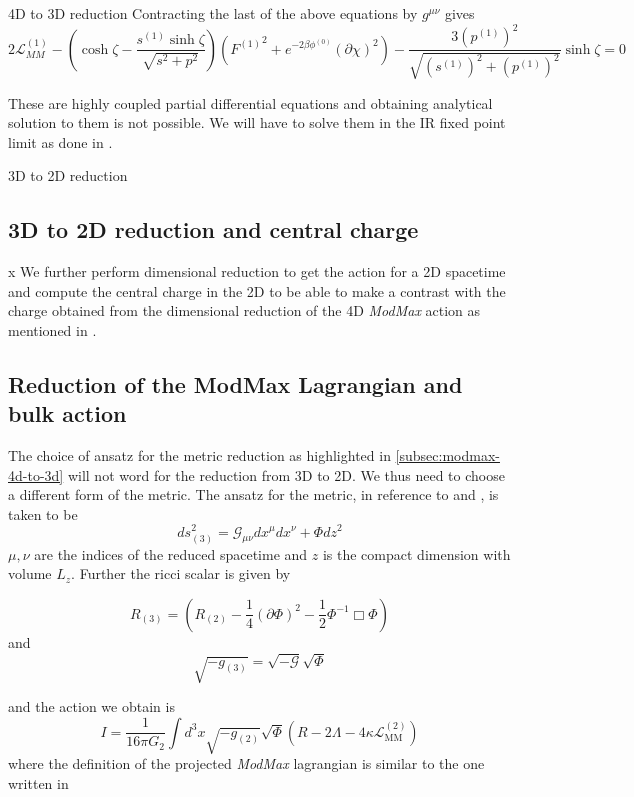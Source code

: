 \begin{frame}[allowframebreaks]{4D to 3D reduction \cite{Dharewa2024}}
Contracting the last of the above equations by $g^{\mu\nu}$ gives 
\begin{equation}
    2\mathcal{L}^{(1)}_{MM} - \left ( \cosh \zeta - \frac{s^{(1)}\sinh\zeta}{\sqrt{s^2+p^2} } \right ) \left ( {F^{(1)}}^2 + e^{-2\beta\phi^{(0)}}(\partial\chi)^2 \right ) - \frac{3(p^{(1)})^2}{\sqrt{(s^{(1)})^2+(p^{(1)})^2}}\sinh\zeta = 0 \nonumber
\end{equation}

These are highly coupled partial differential equations and obtaining analytical solution to them is not possible. We will have to solve them in the IR fixed point limit as done in \cite{rathi2023ads2}.
\end{frame}

\begin{frame}[allowframebreaks]{3D to 2D reduction}
\subsection{3D to 2D reduction and central charge}
                                                    x
We further perform dimensional reduction to get the action for a 2D spacetime and compute the central charge in the 2D to be able to make a contrast with the charge obtained from the dimensional reduction of the 4D \textit{ModMax} action as mentioned in \cite{rathi2023ads2}. 

\subsection{Reduction of the ModMax Lagrangian and bulk action}
The choice of ansatz for the metric reduction as highlighted in \ref{subsec:modmax-4d-to-3d} will not word for the reduction from 3D to 2D. We thus need to choose a different form of the metric. The ansatz for the metric, in reference to \cite{Dharewa2024} and \cite{rathi2023ads2}, is taken to be 
\begin{equation}
    ds_{(3)}^2 = \mathcal{G}_{\mu\nu}dx^\mu dx^\nu + \Phi dz^2
\end{equation}
$\mu,\nu$ are the indices of the reduced spacetime and $z$ is the compact dimension with volume $L_z$. Further the ricci scalar is given by 

\begin{equation}
    R_{(3)} = \left ( R_{(2)} - \frac{1}{4}(\partial\Phi)^2 - \frac{1}{2}\Phi^{-1} \Box\Phi \right )
\end{equation}
and 
\begin{equation}
    \sqrt{-g_{(3)}} = \sqrt{-\mathcal{G}}\sqrt{ \Phi}
\end{equation}

and the action we obtain is 
\begin{equation}
    I = \frac{1}{16\pi G_2}\int d^3x\sqrt{-g_{(2)}}\sqrt{\Phi}  \left(R - 2\Lambda - 4\kappa\mathcal{L}_{\text{MM}}^{(2)}\right)
\end{equation}
where the definition of the projected \textit{ModMax} lagrangian is similar to the one written in \cite{rathi2023ads2}



\end{frame}

